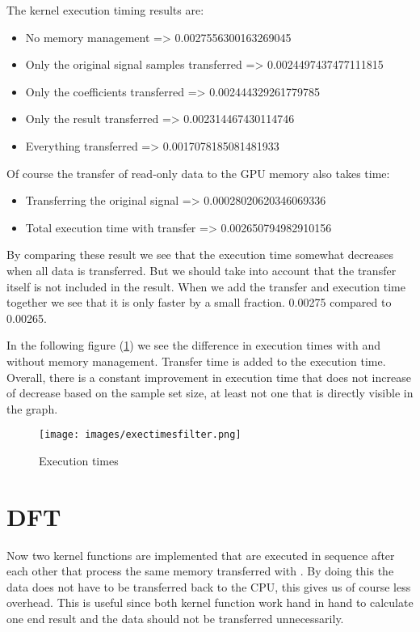 The kernel execution timing results are:
\begin{itemize}
    \item No memory management => 0.0027556300163269045
    \item Only the original signal samples transferred => 0.0024497437477111815
    \item Only the coefficients transferred => 0.002444329261779785
    \item Only the result transferred => 0.002314467430114746
    \item Everything transferred => 0.0017078185081481933
\end{itemize}

Of course the transfer of read-only data to the GPU memory also takes time:
\begin{itemize}
    \item Transferring the original signal => 0.00028020620346069336
    \item Total execution time with transfer => 0.002650794982910156
\end{itemize}

By comparing these result we see that the execution time somewhat decreases when all data is transferred. But we should take into account that the transfer itself is not included in the result. When we add the transfer and execution time together we see that it is only faster by a small fraction. 0.00275 compared to 0.00265.

\newpage

In the following figure (\ref{figure:exec_times}) we see the difference in execution times with and without memory management. Transfer time is added to the execution time. Overall, there is a constant improvement in execution time that does not increase of decrease based on the sample set size, at least not one that is directly visible in the graph.

\begin{figure}[H]
    \centering
    \texttt{[image: images/exectimesfilter.png]}
    \caption{Execution times}
    \label{figure:exec_times}
\end{figure}
  

\section{DFT}
\label{sec:DFT}

Now two kernel functions are implemented that are executed in sequence after each other that process the same memory transferred with . By doing this the data does not have to be transferred back to the CPU, this gives us of course less overhead. This is useful since both kernel function work hand in hand to calculate one end result and the data should not be transferred unnecessarily.

